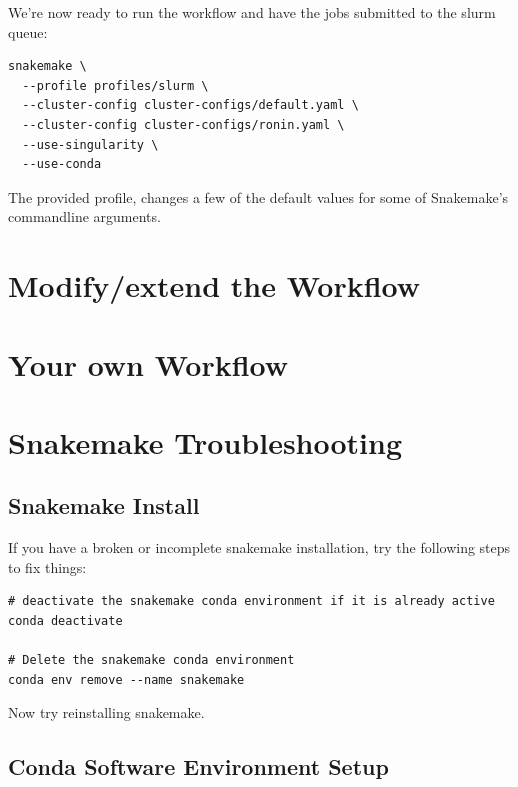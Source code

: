 We're now ready to run the workflow and have the jobs submitted to the slurm queue:

\begin{lstlisting}
snakemake \
  --profile profiles/slurm \
  --cluster-config cluster-configs/default.yaml \
  --cluster-config cluster-configs/ronin.yaml \
  --use-singularity \
  --use-conda
\end{lstlisting}

The provided profile, changes a few of the default values for some of Snakemake's commandline arguments.



\section{Modify/extend the Workflow}

\section{Your own Workflow}

\section{Snakemake Troubleshooting}
\label{sec:snake_trouble}

\subsection{Snakemake Install}

If you have a broken or incomplete snakemake installation, try the following steps to fix things:

\begin{lstlisting}
# deactivate the snakemake conda environment if it is already active
conda deactivate

# Delete the snakemake conda environment
conda env remove --name snakemake
\end{lstlisting}

Now try reinstalling snakemake.

\subsection{Conda Software Environment Setup}

